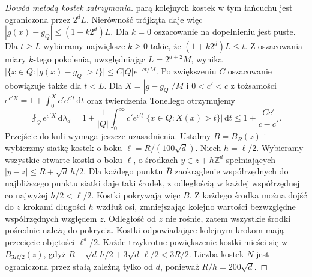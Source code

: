 \begin{proof}[Dowód metodą kostek zatrzymania]
parą kolejnych kostek w tym łańcuchu jest ograniczona
przez $2^dL$. Nierówność trójkąta daje więc
$|g(x)-g_Q|\le(1+k2^d)L$. Dla $k=0$ oszacowanie
na dopełnieniu jest puste.
Dla $t\ge L$ wybieramy największe $k\ge0$ takie, że
$(1+k2^d)L\le t$. Z oszacowania miary $k$-tego pokolenia,
uwzględniając $L=2^{d+2}M$, wynika
$|\{x\in Q:|g(x)-g_Q|>t\}|\le C|Q|e^{-ct/M}$.
Po zwiększeniu $C$ oszacowanie obowiązuje także dla $t<L$.
Dla $X=|g-g_Q|/M$ i $0<c'<c$ z tożsamości
$e^{c'X}=1+\int_0^X c'e^{c't}\,\mathrm dt$ oraz
twierdzenia Tonellego otrzymujemy
\[
 \fint_Q e^{c'X}\,\mathrm d\lambda_d
 =1+\frac{1}{|Q|}\int_0^\infty c'e^{c't}
      |\{x\in Q:X(x)>t\}|\,\mathrm dt
 \le 1+\frac{Cc'}{c-c'}.
\]
Przejście do kuli wymaga jeszcze uzasadnienia. Ustalmy
$B=B_R(z)$ i wybierzmy siatkę kostek o boku
$\ell=R/(100\sqrt d)$. Niech $h=\ell/2$. Wybieramy wszystkie otwarte kostki
o boku $\ell$, o środkach $y\in z+h\mathbb Z^d$ spełniających
$|y-z|\le R+\sqrt d\,h/2$. Dla każdego punktu
$\overline B$ zaokrąglenie współrzędnych do najbliższego
punktu siatki daje taki środek, z odległością w każdej
współrzędnej co najwyżej $h/2<\ell/2$. Kostki pokrywają
więc $\overline B$. Z każdego środka można dojść do $z$
krokami długości $h$ wzdłuż osi, zmniejszając kolejno
wartości bezwzględne współrzędnych względem $z$.
Odległość od $z$ nie rośnie, zatem wszystkie środki
pośrednie należą do pokrycia. Kostki odpowiadające
kolejnym krokom mają przecięcie objętości $\ell^d/2$.
Każde trzykrotne powiększenie kostki mieści się
w $B_{3R/2}(z)$, gdyż
$R+\sqrt d\,h/2+3\sqrt d\,\ell/2<3R/2$.
Liczba kostek $N$ jest ograniczona przez stałą zależną
tylko od $d$, ponieważ $R/h=200\sqrt d$.


\end{proof}
